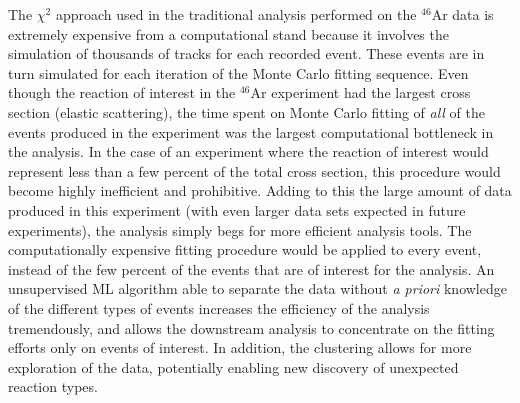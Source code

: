 \documentclass[review,sort&compress]{elsarticle}
\begin{document}
The $\chi^2$ approach used in the traditional analysis performed on the $^{46}$Ar data is extremely expensive from a computational stand because it involves the simulation of thousands of tracks for each recorded event. These events are in turn simulated for each iteration of the Monte Carlo fitting sequence. Even though the reaction of interest in the $^{46}$Ar experiment had the largest cross section (elastic scattering), the time spent on Monte Carlo fitting of {\em all} of the events produced in the experiment was the largest computational bottleneck in the analysis. In the case of an experiment where the reaction of interest would represent less than a few percent of the total cross section, this procedure would become highly inefficient and prohibitive. Adding to this the large amount of data produced in this experiment (with even larger data sets expected in future experiments), the analysis simply begs for more efficient analysis tools. 
The computationally expensive fitting procedure would be applied to every event, instead of the few percent of the events that are of interest for the analysis.
An unsupervised ML algorithm able to separate the data without {\em a priori} knowledge of the different types of events increases the efficiency of the analysis tremendously, and allows the downstream analysis to concentrate on the fitting efforts only on events of interest. In addition, the clustering allows for more exploration of the data, potentially enabling new discovery of unexpected reaction types.




\end{document}
